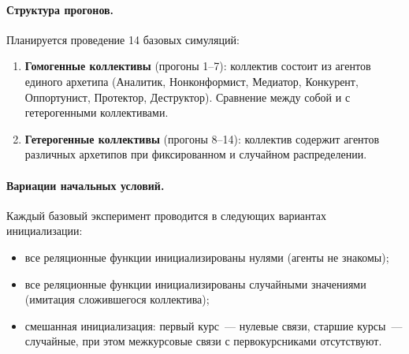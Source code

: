 \documentclass[12pt]{article}
\begin{document}
\paragraph{Структура прогонов.}
Планируется проведение 14 базовых симуляций:
\begin{enumerate}
    \item \textbf{Гомогенные коллективы} (прогоны 1--7): коллектив состоит из агентов единого архетипа (Аналитик, Нонконформист, Медиатор, Конкурент, Оппортунист, Протектор, Деструктор). Сравнение между собой и с гетерогенными коллективами.
    \item \textbf{Гетерогенные коллективы} (прогоны 8--14): коллектив содержит агентов различных архетипов при фиксированном и случайном распределении.
\end{enumerate}

\paragraph{Вариации начальных условий.}
Каждый базовый эксперимент проводится в следующих вариантах инициализации:
\begin{itemize}
    \item все реляционные функции инициализированы нулями (агенты не знакомы);
    \item все реляционные функции инициализированы случайными значениями (имитация сложившегося коллектива);
    \item смешанная инициализация: первый курс~--- нулевые связи, старшие курсы~--- случайные, при этом межкурсовые связи с первокурсниками отсутствуют.
\end{itemize}
\end{document}
